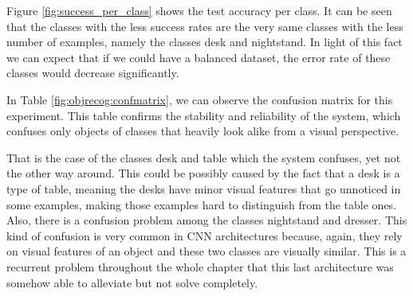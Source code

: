 Figure \ref{fig:success_per_class} shows the test accuracy per class. It can be seen that the classes with the less success rates are the very same classes with the less number of examples, namely the classes desk and nightstand. In light of this fact we can expect that if we could have a balanced dataset, the error rate of these classes would decrease significantly.

In Table \ref{fig:objrecog:confmatrix}, we can observe the confusion matrix for this experiment. This table confirms the stability and reliability of the system, which confuses only objects of classes that heavily look alike from a visual perspective.

\begin{table}[!t]
    \centering
	\footnotesize
	\caption{Confusion matrix of the classification results achieved by \emph{LonchaNet} after $18300$ training iterations using the \emph{ModelNet-10} dataset (solver is ADAM, learning rate is 0.00001, $\beta_1$ is 0.9 and $beta_2$ is 0.999). It is important to remark the confusion between the classes Desk and Table and Nightstand and Dresser. The values shown in the table are percentages.}
	\label{fig:objrecog:confmatrix}
\end{table}

That is the case of the classes desk and table which the system confuses, yet not the other way around. This could be possibly caused by the fact that a desk is a type of table, meaning the desks have minor visual features that go unnoticed in some examples, making those examples hard to distinguish from the table ones. Also, there is a confusion problem among the classes nightstand and dresser. This kind of confusion is very common in \acs{CNN} architectures because, again, they rely on visual features of an object and these two classes are visually similar. This is a recurrent problem throughout the whole chapter that this last architecture was somehow able to alleviate but not solve completely.

